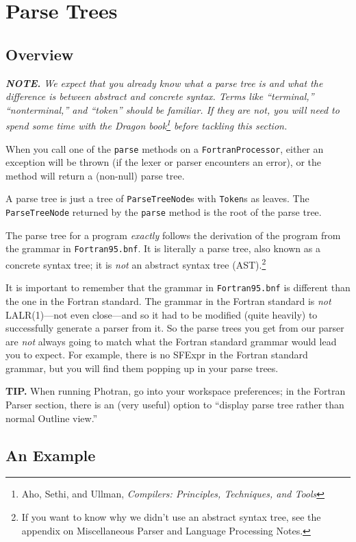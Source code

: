 \section{Parse Trees}

\subsection{Overview}
\textit{
\textbf{NOTE.}
We expect that you already know what a parse tree is and what the difference
is between abstract and concrete syntax.  Terms like ``terminal,''
``nonterminal,'' and ``token'' should be familiar.  If they are not,
you will need to spend some time with the Dragon book\footnote{Aho, Sethi,
and Ullman, \textit{Compilers: Principles, Techniques, and Tools}} before
tackling this section.}

When you call one of the \texttt{parse} methods on a \texttt{FortranProcessor},
either an exception will be thrown (if the lexer or parser encounters an
error), or the method will return a (non-null) parse tree.

A parse tree is just a tree of \texttt{ParseTreeNode}s with \texttt{Token}s
as leaves.  The \texttt{ParseTreeNode} returned by the \texttt{parse} method
is the root of the parse tree.

The parse tree for a program \textit{exactly} follows the derivation of the
program from the grammar in \texttt{Fortran95.bnf}.  It is literally a
parse tree, also known as a concrete syntax tree; it is \textit{not} an
abstract syntax tree (AST).\footnote{If you want to know why we didn't use an
abstract syntax tree, see the appendix on Miscellaneous Parser and Language
Processing Notes.} 

It is important to remember that the grammar in
\texttt{Fortran95.bnf} is different than the one in the Fortran standard.
The grammar in the Fortran standard is \textit{not} LALR(1)---not even
close---and so it had to be modified (quite heavily) to successfully
generate a parser from it.  So the parse trees you get from our parser are
\textit{not} always going to match what the Fortran standard grammar would
lead you to expect.  For example, there is no SFExpr in the Fortran standard
grammar, but you will find them popping up in your parse trees.

\textbf{TIP.}
When running Photran, go into your workspace preferences; in the Fortran Parser
section, there is an (very useful) option to ``display parse tree rather
than normal Outline view.''

\subsection{An Example}

